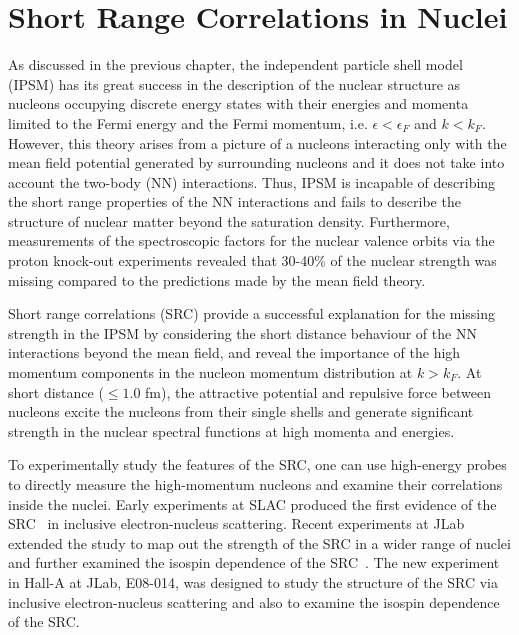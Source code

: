 \chapter{Short Range Correlations in Nuclei}
 As discussed in the previous chapter, the independent particle shell model (IPSM) has its great success in the description of the nuclear structure as nucleons occupying discrete energy states with their energies and momenta limited to the Fermi energy and the Fermi momentum, i.e. $\epsilon < \epsilon_{F}$ and $k<k_{F}$. However, this theory arises from a picture of a nucleons interacting only with the mean field potential generated by surrounding nucleons and it does not take into account the two-body (NN) interactions. Thus, IPSM is incapable of describing the short range properties of the NN interactions and fails to describe the structure of nuclear matter beyond the saturation density. Furthermore, measurements of the spectroscopic factors for the nuclear valence orbits via the proton knock-out experiments revealed that 30-40\% of the nuclear strength was missing compared to the predictions made by the mean field theory.
 
 Short range correlations (SRC) provide a successful explanation for the missing strength in the IPSM by considering the short distance behaviour of the NN interactions beyond the mean field, and reveal the importance of the high momentum components in the nucleon momentum distribution at $k>k_{F}$. At short distance ($\mathrm{\leq 1.0}$ fm), the attractive potential and repulsive force between nucleons excite the nucleons from their single shells and generate significant strength in the nuclear spectral functions at high momenta and energies. 
 
 To experimentally study the features of the SRC, one can use high-energy probes to directly measure the high-momentum nucleons and examine their correlations inside the nuclei. Early experiments at SLAC produced the first evidence of the SRC~\cite{SLAC_Measurement_PRC.48.2451} in inclusive electron-nucleus scattering. Recent experiments at JLab extended the study to map out the strength of the SRC in a wider range of nuclei and further examined the isospin dependence of the SRC~\cite{PhysRevLett.96.082501,PhysRevLett.99.072501,Subedi:2008zz,PhysRevLett.108.092502}. The new experiment in Hall-A at JLab, E08-014, was designed to study the structure of the SRC via inclusive electron-nucleus scattering and also to examine the isospin dependence of the SRC. 
 
